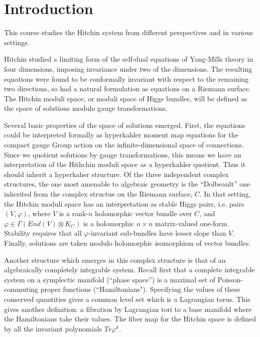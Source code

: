 

\chapter{Introduction}

This course studies the Hitchin system from different perspectives and in various settings.

Hitchin studied a limiting form of the self-dual equations of Yang-Mills theory in four dimensions,
imposing invariance under two of the dimensions.  The resulting equations were found to be
conformally invariant with respect to the remaining two directions, so had a natural formulation
as equations on a Riemann surface.  The Hitchin moduli space, or moduli space of Higgs bundles,
will be defined as the space of solutions modulo gauge transformations.

Several basic properties of the space of solutions emerged.  First, the equations could be
interpreted formally as hyperkahler moment map equations for the compact gauge Group action
on the infinite-dimensional space of connections.  Since we quotient solutions by gauge
transformations, this means we have an interpretation of the Hithchin moduli space as a hyperkahler
quotient.  Thus it should inherit a hyperkaher structure.  Of the three independent complex structures,
the one most amenable to algebraic geometry is the ``Dolbeault'' one inherited from the complex
structue on the Riemann surface, $C$.  In that setting, the Hitchin moduli space has an
interpretation as stable Higgs pairs, i.e. pairs $(V,\varphi)$, where $V$ is a rank-$n$ holomorphic
vector bundle over $C$, and $\varphi\in \Gamma(End(V)\otimes K_C)$ is a holomorphic $n\times n$
matrix-valued one-form.  Stability requires that all $\varphi$-invariant sub-bundles have lesser slope
than $V$.  Finally, solutions are taken modulo holomorphic isomorphism of vector bundles.

Another structure which emerges in this complex structure
is that of an algebraically completely integrable system.
Recall first that a complete integrable system on a symplectic manifold (``phase space'') is a
maximal set of Poisson-commuting proper functions (``Hamiltonians").  Specifying the values
of these conserved quantities gives a common level set which is a Lagrangian torus.
This gives another definition:  a fibration by Lagrangian tori to a base manifold where the
Hamiltonians take their values.  The fiber map for the Hitchin space is defined by all the
invariant polynomials $Tr\varphi^k$.

